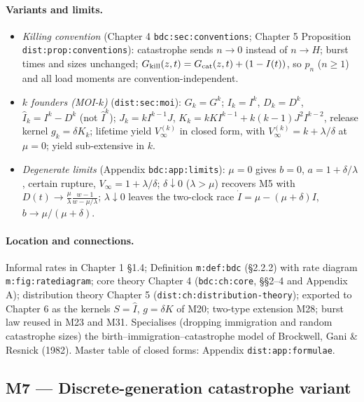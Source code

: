 \documentclass[11pt,a4paper]{article}
\begin{document}
\paragraph{Variants and limits.}
\begin{itemize}
\item \emph{Killing convention} (Chapter 4 \texttt{bdc:sec:conventions};
  Chapter 5 Proposition \texttt{dist:prop:conventions}): catastrophe sends
  $n\to0$ instead of $n\to H$; burst times and sizes unchanged;
  $G_{\rm kill}(z,t)=G_{\rm cat}(z,t)+(1-I(t))$, so $p_n$ ($n\ge1$) and all
  load moments are convention-independent.
\item \emph{$k$ founders (MOI-$k$)} (\texttt{dist:sec:moi}): $G_k=G^k$;
  $I_k=I^k$, $D_k=D^k$, $\hat I_k=I^k-D^k$ (not $\hat I^k$);
  $J_k=kI^{k-1}J$, $K_k=kKI^{k-1}+k(k-1)J^2I^{k-2}$, release kernel
  $g_k=\delta K_k$; lifetime yield $V_\infty^{(k)}$ in closed form, with
  $V_\infty^{(k)}=k+\lambda/\delta$ at $\mu=0$; yield sub-extensive in $k$.
\item \emph{Degenerate limits} (Appendix \texttt{bdc:app:limits}): $\mu=0$
  gives $b=0$, $a=1+\delta/\lambda$, certain rupture, $V_\infty=1+\lambda/
  \delta$; $\delta\downarrow0$ ($\lambda>\mu$) recovers M5 with
  $D(t)\to\frac{\mu}{\lambda}\frac{w-1}{w-\mu/\lambda}$; $\lambda\downarrow0$
  leaves the two-clock race $\dot I=\mu-(\mu+\delta)I$,
  $b\to\mu/(\mu+\delta)$.
\end{itemize}

\paragraph{Location and connections.} Informal rates in Chapter 1 \S1.4;
Definition \texttt{m:def:bdc} (\S2.2.2) with rate diagram
\texttt{m:fig:ratediagram}; core theory Chapter 4 (\texttt{bdc:ch:core},
\S\S2--4 and Appendix A); distribution theory Chapter 5
(\texttt{dist:ch:distribution-theory}); exported to Chapter 6 as the kernels
$S=\hat I$, $g=\delta K$ of M20; two-type extension M28; burst law reused in
M23 and M31. Specialises (dropping immigration and random catastrophe sizes)
the birth--immigration--catastrophe model of Brockwell, Gani \& Resnick
(1982). Master table of closed forms: Appendix \texttt{dist:app:formulae}.

\subsection{M7 --- Discrete-generation catastrophe variant}
\end{document}
